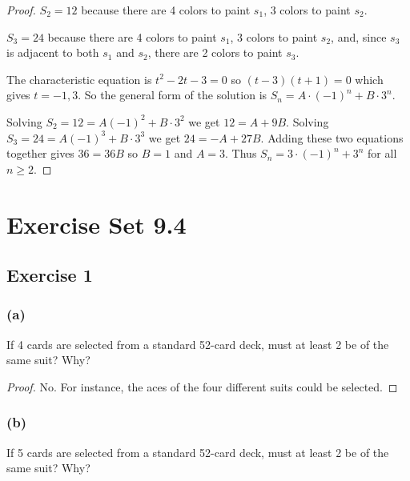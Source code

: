 \documentclass[14pt]{extarticle}
\begin{document}
\begin{proof}
     \(S_2 = 12\) because there are 4 colors to paint \(s_1\), 3 colors to paint \(s_2\).

     \(S_3 = 24\) because there are 4 colors to paint \(s_1\), 3 colors to paint \(s_2\), and, since \(s_3\) is adjacent to
     both \(s_1\) and \(s_2\), there are 2 colors to paint \(s_3\).

     The characteristic equation is \(t^2 - 2t - 3 = 0\) so \((t-3)(t+1) = 0\) which gives \(t = -1, 3\). So the general
     form of the solution is \(S_n = A \cdot (-1)^n + B \cdot 3^n\).

     Solving \(S_2 = 12 = A(-1)^2 + B \cdot 3^2\) we get \(12 = A + 9B\). Solving \(S_3 = 24 = A(-1)^3 + B \cdot 3^3\) we get
     \(24 = -A + 27B\). Adding these two equations together gives \(36 = 36B\) so \(B = 1\) and \(A = 3\).
     Thus \(S_n = 3\cdot(-1)^n + 3^n\) for all \(n \geq 2\).
\end{proof}

\section{Exercise Set 9.4}

\subsection{Exercise 1}
\subsubsection{(a)}
If 4 cards are selected from a standard 52-card deck, must at least 2 be of the same suit? Why?

\begin{proof}
     No. For instance, the aces of the four different suits could be selected.
\end{proof}

\subsubsection{(b)}
If 5 cards are selected from a standard 52-card deck, must at least 2 be of the same suit? Why?
\end{document}
